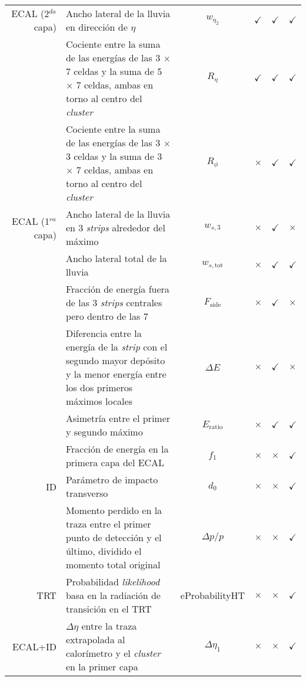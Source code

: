 \begin{table}
{\begin{tabular}{ r p{8cm} c | c c | c }
	ECAL (2$^{da}$ capa) & Ancho lateral de la lluvia en dirección de $\eta$ & $w_{\eta_{2}}$ & $\checkmark$ & $\checkmark$ & $\checkmark$ \\

		& Cociente entre la suma de las energías de las 3 $\times$ 7 celdas y la suma de 5 $\times$ 7 celdas, ambas en torno al centro del \textit{cluster} & $R_{\eta}$ & $\checkmark$ & $\checkmark$ & $\checkmark$ \\

		& Cociente entre la suma de las energías de las 3 $\times$ 3 celdas y la suma de 3 $\times$ 7 celdas, ambas en torno al centro del \textit{cluster} & $R_{\phi}$ & $\times$ & $\checkmark$ & $\checkmark$ \\

	ECAL (1$^{ra}$ capa) & Ancho lateral de la lluvia en 3 \textit{strips} alrededor del máximo & $w_{s,3}$ & $\times$ & $\checkmark$ & $\times$ \\

		& Ancho lateral total de la lluvia & $w_{s,\text{tot}}$ & $\times$ & $\checkmark$ & $\checkmark$ \\

		& Fracción de energía fuera de las 3 \textit{strips} centrales pero dentro de las 7 & $F_{\text{side}}$ & $\times$ & $\checkmark$ & $\times$ \\

		& Diferencia entre la energía de la \textit{strip} con el segundo mayor depósito y la menor energía entre los dos primeros máximos locales & $\Delta E$ & $\times$ & $\checkmark$ & $\times$ \\

		& Asimetría entre el primer y segundo máximo & $E_{\text{ratio}}$ & $\times$ & $\checkmark$ & $\checkmark$  \\

		& Fracción de energía en la primera capa del ECAL & $f_{1}$ & $\times$ & $\times$ & $\checkmark$  \\

	ID & Parámetro de impacto transverso& $d_{0}$ & $\times$ & $\times$ & $\checkmark$ \\

		& Momento perdido en la traza entre el primer punto de detección y el último, dividido el momento total original & $\Delta p/p$ & $\times$ & $\times$ & $\checkmark$  \\

	TRT & Probabilidad \textit{likelihood} basa en la radiación de transición en el TRT & eProbabilityHT & $\times$ & $\times$ & $\checkmark$  \\

	ECAL+ID & $\Delta\eta$ entre la traza extrapolada al calorímetro y el \textit{cluster} en la primer capa& $\Delta\eta_{1}$ & $\times$ & $\times$ & $\checkmark$ \\

	\hline

\end{tabular}}
\label{lmttable}
\end{table}
\renewcommand{\arraystretch}{1}

